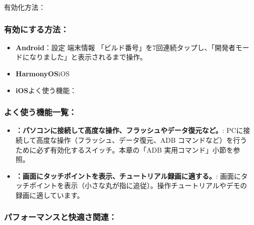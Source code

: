 


有効化方法：

\subsubsection*{有効にする方法：}

\begin{itemize}
  \item \textbf{Android}：設定 端末情報 「ビルド番号」を7回連続タップし、「開発者モードになりました」と表示されるまで操作。
  \item \textbf{HarmonyOS}iOS
  \item \textbf{iOS}よく使う機能：
\end{itemize}

\subsubsection*{よく使う機能一覧：}

\begin{itemize}
  \item \textbf{：パソコンに接続して高度な操作、フラッシュやデータ復元など。}: PCに接続して高度な操作（フラッシュ、データ復元、ADB コマンドなど）を行うために必ず有効化するスイッチ。本章の「ADB 実用コマンド」小節を参照。
  \item \textbf{：画面にタッチポイントを表示、チュートリアル録画に適する。}: 画面にタッチポイントを表示（小さな丸が指に追従）。操作チュートリアルやデモの録画に適しています。
\end{itemize}

\subsubsection*{パフォーマンスと快適さ関連：}

